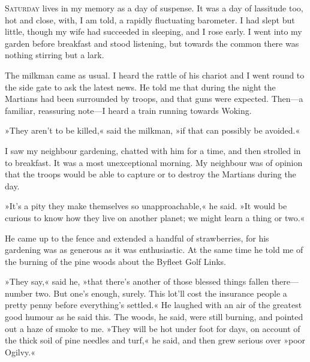 

\lettrine[lines=4,findent=2pt]{S}{aturday} lives in my memory as a day of suspense. It was a day of lassitude too, hot and close, with, I am told, a rapidly fluctuating barometer. I had slept but little, though my wife had succeeded in sleeping, and I rose early. I went into my garden before breakfast and stood listening, but towards the common there was nothing stirring but a lark.

The milkman came as usual. I heard the rattle of his chariot and I went round to the side gate to ask the latest news. He told me that during the night the Martians had been surrounded by troops, and that guns were expected. Then—a familiar, reassuring note—I heard a train running towards Woking.

»They aren't to be killed,« said the milkman, »if that can possibly be avoided.«

I saw my neighbour gardening, chatted with him for a time, and then strolled in to breakfast. It was a most unexceptional morning. My neighbour was of opinion that the troops would be able to capture or to destroy the Martians during the day.

»It's a pity they make themselves so unapproachable,« he said. »It would be curious to know how they live on another planet; we might learn a thing or two.«

He came up to the fence and extended a handful of strawberries, for his gardening was as generous as it was enthusiastic. At the same time he told me of the burning of the pine woods about the Byfleet Golf Links. \label{cylinder2b}

»They say,« said he, »that there's another of those blessed things fallen there—\allowbreak number two. But one's enough, surely. This lot'll cost the insurance people a pretty penny before everything's settled.« He laughed with an air of the greatest good humour as he said this. The woods, he said, were still burning, and pointed out a haze of smoke to me. »They will be hot under foot for days, on account of the thick soil of pine needles and turf,« he said, and then grew serious over »poor Ogilvy.«


